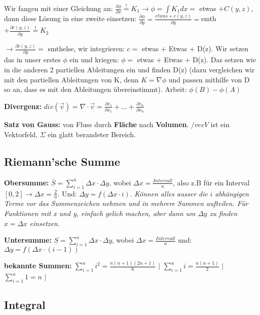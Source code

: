 \documentclass[a3paper, ngerman, 8pt]{article}
\newcommand{\mbeq}{\overset{!}{=}}
\begin{document}
\begin{multicols*}{3}
Wir fangen mit einer Gleichung an: $\frac{\partial\phi}{\partial x}\mbeq K_1 \to \phi = \int K_1 dx = $ etwas $+C(y,z)$, dann diese Lösung in eine zweite einsetzen: $\frac{\partial\phi}{\partial y}=\frac{etwas + c(y,z)}{\partial y}= $smth$ + \frac{\partial c(y,z)}{\partial y} \mbeq K_2 $

$\to \frac{\partial c(y,z)}{\partial y} =$ smthelse, wir integrieren: $c=$ etwas + Etwas + D(z). Wir setzen das in unser erstes $\phi$ ein und kriegen: $\phi =$ etwas + Etwas + D(z). Das setzen wie in die anderen 2 partiellen Ableitungen ein und finden D(z) (dazu vergleichen wir mit den partiellen Ableitungen von K, denn $K=\nabla \phi$ und passen mithilfe von D so an, dass es mit den Ableitungen übereinstimmt). Arbeit: $\phi (B)-\phi(A)$


\textbf{Divergenz:} $div(\vec{v})=\nabla \cdot \vec{v}=\frac{\partial v_1}{\partial x_1}+...+\frac{\partial v_n}{\partial x_n}$

\textbf{Satz von Gauss:}  von Fluss durch \textbf{Fläche} nach \textbf{Volumen}. $/vec{V}$ ist ein Vektorfeld, $\Sigma$ ein glatt berandeter Bereich.

\subsection*{Riemann'sche Summe}
\textbf{Obersumme:} $\bar{S}=\sum_{i=1}^{n} \Delta x \cdot \Delta y$, wobei $\Delta x = \frac{Intervall}{n}$, also z.B für ein Interval $[0,2] \to \Delta x = \frac{2}{n}$. Und: $\Delta y = f(\Delta x \cdot i)$.
\textit{Können alles ausser die $i$ abhängigen Terme vor das Summenzeichen nehmen und in mehrere Summen aufteilen. Für Funktionen mit x und y, einfach gelich machen, aber dann um $\Delta y$ zu finden $x=\Delta x$ einsetzen.}

\textbf{Untersumme:} $\underline{S}=\sum_{i=1}^{n} \Delta x \cdot \Delta y$, wobei $\Delta x = \frac{Intervall}{n}$ und: $\Delta y = f(\Delta x \cdot (i-1))$


\textbf{bekannte Summen:} $\sum_{i=1}^{n} i^2 = \frac{n(n+1)(2n+1)}{6}$ $\big \vert$ $\sum_{i=1}^{n} i = \frac{n(n+1)}{2}$  $\big \vert$ $\sum_{i=1}^{n} 1=n$ $\big \vert$ 

\subsection*{Integral}


\end{multicols*}
\end{document}
